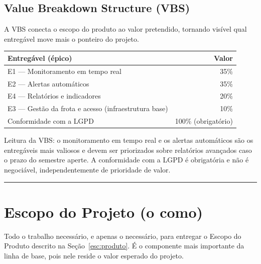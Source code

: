 \documentclass[11pt,a4paper]{article}
\newcommand{\separador}{\par\vspace{2mm}\hrule\vspace{4mm}}
\begin{document}
\subsection{Value Breakdown Structure (VBS)}\label{esc:vbs}
A VBS conecta o escopo do produto ao valor pretendido, tornando visível qual entregável move mais o ponteiro do projeto.

\begin{center}
\begin{tabularx}{\textwidth}{L r}
\toprule
\textbf{Entregável (épico)} & \textbf{Valor} \\
\midrule
E1 --- Monitoramento em tempo real & 35\% \\
E2 --- Alertas automáticos & 35\% \\
E4 --- Relatórios e indicadores & 20\% \\
E3 --- Gestão da frota e acesso (infraestrutura base) & 10\% \\
Conformidade com a LGPD & 100\% (obrigatório) \\
\bottomrule
\end{tabularx}
\end{center}

\noindent Leitura da VBS: o monitoramento em tempo real e os alertas automáticos são os entregáveis mais valiosos e devem ser priorizados sobre relatórios avançados caso o prazo do semestre aperte. A conformidade com a LGPD é obrigatória e não é negociável, independentemente de prioridade de valor.

\separador

\section{Escopo do Projeto (o como)}\label{esc:projeto}

\noindent Todo o trabalho necessário, e apenas o necessário, para entregar o Escopo do Produto descrito na Seção~\ref{esc:produto}. É o componente mais importante da linha de base, pois nele reside o valor esperado do projeto.
\end{document}
